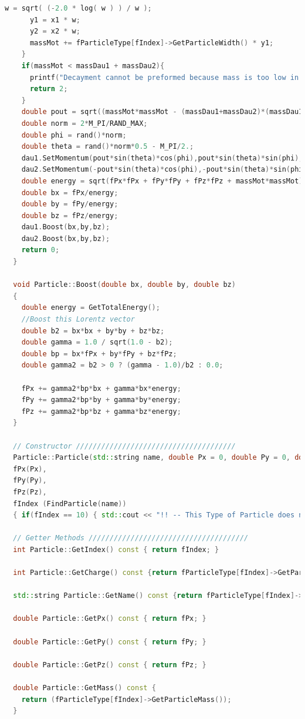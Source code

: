 \documentclass[a4paper, 11pt]{article}
\begin{document}
\begin{lstlisting}[language=c++, style=code]
      w = sqrt( (-2.0 * log( w ) ) / w );
      y1 = x1 * w;
      y2 = x2 * w;
      massMot += fParticleType[fIndex]->GetParticleWidth() * y1;
    }
    if(massMot < massDau1 + massDau2){
      printf("Decayment cannot be preformed because mass is too low in this channel\n");
      return 2;
    }
    double pout = sqrt((massMot*massMot - (massDau1+massDau2)*(massDau1+massDau2))*(massMot*massMot - (massDau1-massDau2)*(massDau1-massDau2)))/massMot*0.5;
    double norm = 2*M_PI/RAND_MAX;
    double phi = rand()*norm;
    double theta = rand()*norm*0.5 - M_PI/2.;
    dau1.SetMomentum(pout*sin(theta)*cos(phi),pout*sin(theta)*sin(phi),pout*cos(theta));
    dau2.SetMomentum(-pout*sin(theta)*cos(phi),-pout*sin(theta)*sin(phi),-pout*cos(theta));
    double energy = sqrt(fPx*fPx + fPy*fPy + fPz*fPz + massMot*massMot);
    double bx = fPx/energy;
    double by = fPy/energy;
    double bz = fPz/energy;
    dau1.Boost(bx,by,bz);
    dau2.Boost(bx,by,bz);
    return 0;
  }

  void Particle::Boost(double bx, double by, double bz)
  {
    double energy = GetTotalEnergy();
    //Boost this Lorentz vector
    double b2 = bx*bx + by*by + bz*bz;
    double gamma = 1.0 / sqrt(1.0 - b2);
    double bp = bx*fPx + by*fPy + bz*fPz;
    double gamma2 = b2 > 0 ? (gamma - 1.0)/b2 : 0.0;

    fPx += gamma2*bp*bx + gamma*bx*energy;
    fPy += gamma2*bp*by + gamma*by*energy;
    fPz += gamma2*bp*bz + gamma*bz*energy;
  }

  // Constructor //////////////////////////////////////
  Particle::Particle(std::string name, double Px = 0, double Py = 0, double Pz = 0):
  fPx(Px),
  fPy(Py),
  fPz(Pz),
  fIndex (FindParticle(name))
  { if(fIndex == 10) { std::cout << "!! -- This Type of Particle does not Excist -- !!" << '\n'; } }

  // Getter Methods //////////////////////////////////////
  int Particle::GetIndex() const { return fIndex; }

  int Particle::GetCharge() const {return fParticleType[fIndex]->GetParticleCharge(); }

  std::string Particle::GetName() const {return fParticleType[fIndex]->GetParticleName();}

  double Particle::GetPx() const { return fPx; }

  double Particle::GetPy() const { return fPy; }

  double Particle::GetPz() const { return fPz; }

  double Particle::GetMass() const {
    return (fParticleType[fIndex]->GetParticleMass());
  }


\end{lstlisting}
\end{document}

